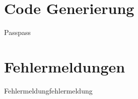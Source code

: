 \section{Code Generierung}
\label{sec:code_generierung}
\begin{Definition}{Pass}{pass}
\end{Definition}
\section{Fehlermeldungen}
\begin{Definition}{Fehlermeldung}{fehlermeldung}
\end{Definition}

